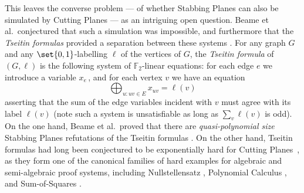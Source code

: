 \documentclass[11pt]{article}
\begin{document}
This leaves the converse problem --- of whether Stabbing Planes can also be simulated by Cutting Planes --- as an intriguing open question.
Beame et al.~conjectured that such a simulation was impossible, and furthermore that the \emph{Tseitin formulas} provided a separation between these systems \cite{BeameFIKPPR18}.
For any graph $G$ and any $\set{0,1}$-labelling $\ell$ of the vertices of $G$, the \emph{Tseitin formula} of $(G, \ell)$ is the following system of $\mathbb{F}_2$-linear equations: for each edge $e$ we introduce a variable $x_e\,$, and for each vertex $v$ we have an equation
\[ \bigoplus_{u: uv \in E} x_{uv} = \ell(v)\]
asserting that the sum of the edge variables incident with $v$ must agree with its label $\ell(v)$ (note such a system is unsatisfiable as long as $\sum_v \ell(v)$ is odd).
On the one hand, Beame et al.~proved that there are \emph{quasi-polynomial size} Stabbing Planes refutations of the Tseitin formulas \cite{BeameFIKPPR18}.
On the other hand, Tseitin formulas had long been conjectured to be exponentially hard for Cutting Planes~\cite{CookCT87}, as they form one of the canonical families of hard examples for algebraic and semi-algebraic proof systems, including Nullstellensatz \cite{dima-nsatz}, Polynomial Calculus \cite{bgip}, and Sum-of-Squares \cite{dima-sos,Schoenebeck08}. 
\end{document}
